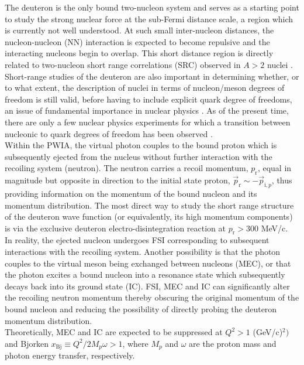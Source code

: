 The deuteron is the only bound two-nucleon  system and serves as a starting point to study the strong nuclear force at the sub-Fermi distance scale, a region which is currently
not well understood. At such small inter-nucleon distances, the nucleon-nucleon (NN) interaction is expected to become repulsive and the interacting
nucleons begin to overlap. This short distance region is directly related to two-nucleon short range correlations (SRC) observed in $A>2$ nuclei \cite{PhysRevC.68.014313,PhysRevLett.96.082501,PhysRevLett.99.072501,Fomin_2017,Barack_2019,RevModPhys.89.045002}.
Short-range studies of the deuteron are also important in determining whether, or to what extent, the description of nuclei in terms of nucleon/meson degrees of freedom is still valid, before
having to include explicit quark degree of freedoms, an issue of fundamental importance in nuclear physics \cite{sargsian_2015}. As of the present time, there are only a few nuclear physics experiments for
which a transition between nucleonic to quark degrees of freedom has been observed \cite{PhysRevLett.81.4576,PhysRevLett.87.102302,PhysRevC.66.042201}. \\
\indent  Within the PWIA, the virtual photon couples to
the bound proton which is subsequently ejected from the nucleus without further interaction with the recoiling system (neutron). The neutron carries a recoil momentum, $p_{\mathrm{r}}$, equal in magnitude but opposite in direction
to the initial state proton, $\vec{p}_{\mathrm{r}} \sim -\vec{p}_{\mathrm{i},p}$, thus providing information on the momentum of the bound nucleon and its momentum distribution.
The most direct way to study the short range structure of the deuteron wave function (or equivalently, its high momentum components) is via the exclusive deuteron
electro-disintegration reaction at $p_{\mathrm{r}}>300$ MeV/c.\\
\indent In reality, the ejected nucleon undergoes FSI corresponding to subsequent interactions with the recoiling system. Another possibility is that the
photon couples to the virtual meson being exchanged between nucleons (MEC), or that the photon excites a bound nucleon into a resonance state which subsequently
decays back into its ground state (IC).  FSI, MEC and IC can significantly alter the recoiling neutron
momentum thereby obscuring the original momentum of the bound nucleon and reducing the possibility of directly probing the deuteron momentum distribution. \\
\indent Theoretically, MEC and IC are expected to be suppressed at $Q^{2}>1$ (GeV/c)$^{2})$ and Bjorken $x_{\mathrm{Bj}}\equiv Q^{2}/2M_{p}\omega>1$, where $M_{p}$ and $\omega$ are the proton mass and photon energy transfer, respectively.
